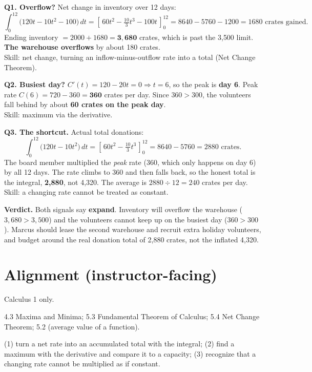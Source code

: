 \documentclass[11pt]{article}
\begin{document}
\begin{keybox}

\textbf{Q1. Overflow?} \; Net change in inventory over 12 days:
\[
\int_0^{12}\!\bigl(120t - 10t^2 - 100\bigr)\,dt
= \left[\,60t^2 - \tfrac{10}{3}t^3 - 100t\,\right]_0^{12}
= 8640 - 5760 - 1200 = \boxed{1680 \text{ crates gained.}}
\]
Ending inventory $= 2000 + 1680 = \mathbf{3{,}680}$ crates, which is past the 3{,}500 limit. \textbf{The warehouse overflows} by about 180 crates. \\[2pt]
{\small\color{accent}Skill: net change, turning an inflow-minus-outflow rate into a total (Net Change Theorem).}

\medskip
\textbf{Q2. Busiest day?} \; $C'(t) = 120 - 20t = 0 \Rightarrow t = 6$, so the peak is \textbf{day 6}. Peak rate $C(6) = 720 - 360 = \mathbf{360}$ crates per day. Since $360 > 300$, the volunteers fall behind by about \textbf{60 crates on the peak day}. \\[2pt]
{\small\color{accent}Skill: maximum via the derivative.}

\medskip
\textbf{Q3. The shortcut.} \; Actual total donations:
\[
\int_0^{12}\!\bigl(120t - 10t^2\bigr)\,dt
= \left[\,60t^2 - \tfrac{10}{3}t^3\,\right]_0^{12}
= 8640 - 5760 = \boxed{2880 \text{ crates.}}
\]
The board member multiplied the \emph{peak} rate (360, which only happens on day 6) by all 12 days. The rate climbs to 360 and then falls back, so the honest total is the integral, \textbf{2{,}880}, not 4{,}320. The average is $2880 \div 12 = 240$ crates per day. \\[2pt]
{\small\color{accent}Skill: a changing rate cannot be treated as constant.}

\medskip
\textbf{Verdict.} \; Both signals say \textbf{expand}. Inventory will overflow the warehouse ($3{,}680 > 3{,}500$) and the volunteers cannot keep up on the busiest day ($360 > 300$). Marcus should lease the second warehouse and recruit extra holiday volunteers, and budget around the real donation total of 2{,}880 crates, not the inflated 4{,}320.

\end{keybox}

\vspace{10pt}

\section*{Alignment \small\color{gray}(instructor-facing)}
\begin{description}[leftmargin=0pt, itemsep=3pt]
\item[Course:] Calculus 1 only.
\item[OpenStax Calculus Volume 1:] 4.3 Maxima and Minima; 5.3 Fundamental Theorem of Calculus; 5.4 Net Change Theorem; 5.2 (average value of a function).
\item[Learning objectives:] (1) turn a net rate into an accumulated total with the integral; (2) find a maximum with the derivative and compare it to a capacity; (3) recognize that a changing rate cannot be multiplied as if constant.
\end{description}
\end{document}
